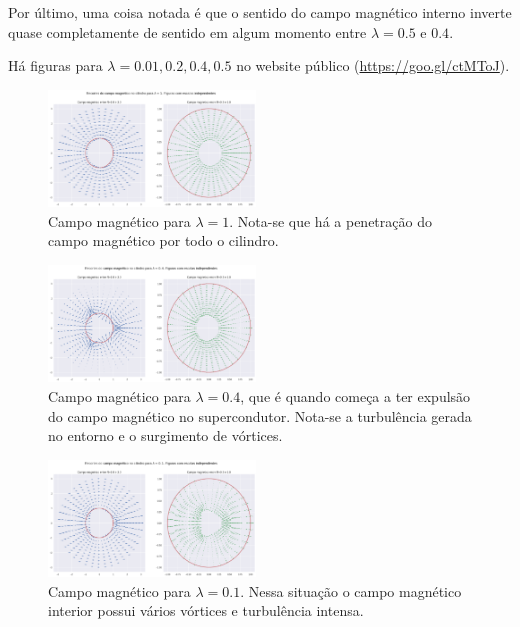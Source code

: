 \documentclass[%
 reprint,
 amsmath,amssymb,
 aps,
]{revtex4-1}
\begin{document}
Por último, uma coisa notada é que o sentido do campo magnético interno inverte quase completamente de sentido em algum momento entre $\lambda=0.5 \mbox{ e } 0.4$.

Há figuras para $\lambda = 0.01, 0.2, 0.4, 0.5$ no website público (\url{https://goo.gl/ctMToJ}).

\begin{figure}[h]
    \label{fig:lambda_1}
    \caption{Campo magnético para $\lambda=1$. Nota-se que há a penetração do campo magnético por todo o cilindro.}
    \includegraphics[width=0.49\textwidth]{lambda_1.png}
\end{figure}

\begin{figure}[h]
    \label{fig:lambda_04}
    \caption{Campo magnético para $\lambda=0.4$, que é quando começa a ter expulsão do campo magnético no supercondutor. Nota-se a turbulência gerada no entorno e o surgimento de vórtices.}
    \includegraphics[width=0.49\textwidth]{lambda_04.png}
\end{figure}

\begin{figure}[h]
    \label{fig:lambda_01}
    \caption{Campo magnético para $\lambda=0.1$. Nessa situação o campo magnético interior possui vários vórtices e turbulência intensa.}
    \includegraphics[width=0.49\textwidth]{lambda_01.png}
\end{figure}
\end{document}
